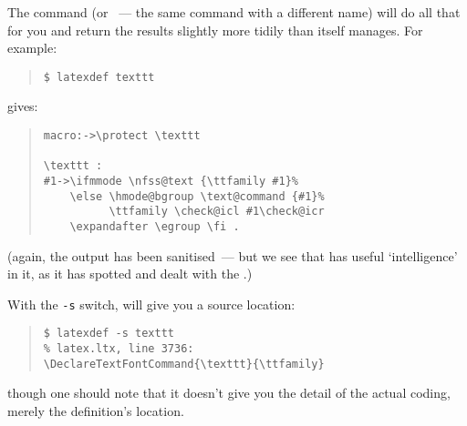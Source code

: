 The command  (or ~--- the same
command with a different name) will do all that for you and return the
results slightly more tidily than \latex{} itself manages.  For
example:
\begin{quote}
\begin{verbatim}
$ latexdef texttt
\end{verbatim}
\end{quote}
gives:
\begin{quote}
\begin{verbatim}
macro:->\protect \texttt  

\texttt :
#1->\ifmmode \nfss@text {\ttfamily #1}%
    \else \hmode@bgroup \text@command {#1}%
          \ttfamily \check@icl #1\check@icr
    \expandafter \egroup \fi .
\end{verbatim}
\end{quote}
(again, the output has been sanitised~--- but we see that
 has useful `intelligence' in it, as it has spotted
and dealt with the .)

With the \texttt{-s} switch,  will give you a
source location:
\begin{quote}
\begin{verbatim}
$ latexdef -s texttt
% latex.ltx, line 3736:
\DeclareTextFontCommand{\texttt}{\ttfamily}
\end{verbatim}
\end{quote}
though one should note that it doesn't give you the detail of the
actual coding, merely the definition's location.

